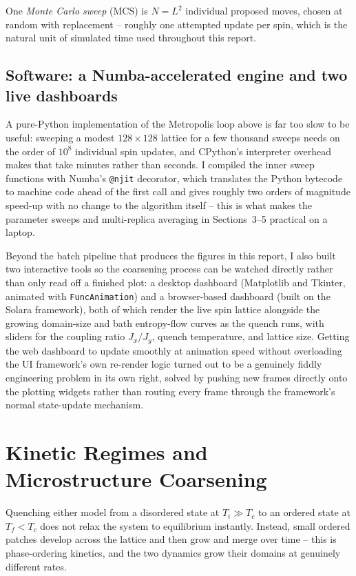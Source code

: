 \documentclass[11pt]{article}
\begin{document}
One \emph{Monte Carlo sweep} (MCS) is $N = L^2$ individual proposed moves,
chosen at random with replacement -- roughly one attempted update per
spin, which is the natural unit of simulated time used throughout this
report.

\subsection{Software: a Numba-accelerated engine and two live dashboards}

A pure-Python implementation of the Metropolis loop above is far too slow
to be useful: sweeping a modest $128\times128$ lattice for a few thousand
sweeps needs on the order of $10^8$ individual spin updates, and CPython's
interpreter overhead makes that take minutes rather than seconds. I
compiled the inner sweep functions with Numba's \texttt{@njit} decorator,
which translates the Python bytecode to machine code ahead of the first
call and gives roughly two orders of magnitude speed-up with no change to
the algorithm itself -- this is what makes the parameter sweeps and
multi-replica averaging in Sections~3--5 practical on a laptop.

Beyond the batch pipeline that produces the figures in this report, I also
built two interactive tools so the coarsening process can be watched
directly rather than only read off a finished plot: a desktop dashboard
(Matplotlib and Tkinter, animated with \texttt{FuncAnimation}) and a
browser-based dashboard (built on the Solara framework), both of which
render the live spin lattice alongside the growing domain-size and bath
entropy-flow curves as the quench runs, with sliders for the
coupling ratio $J_x/J_y$, quench temperature, and lattice size. Getting
the web dashboard to update smoothly at animation speed without
overloading the UI framework's own re-render logic turned out to be a
genuinely fiddly engineering problem in its own right, solved by pushing
new frames directly onto the plotting widgets rather than routing every
frame through the framework's normal state-update mechanism.

\section{Kinetic Regimes and Microstructure Coarsening}

Quenching either model from a disordered state at $T_i \gg T_c$ to an
ordered state at $T_f < T_c$ does not relax the system to equilibrium
instantly. Instead, small ordered patches develop across the lattice
and then grow and merge over time -- this is phase-ordering kinetics, and
the two dynamics grow their domains at genuinely different rates.
\end{document}
